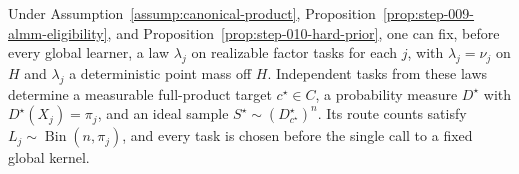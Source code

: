 \begin{lemma}
\label{lem:step-012-ideal-experiment}
Under Assumption~\ref{assump:canonical-product},
Proposition~\ref{prop:step-009-almm-eligibility}, and
Proposition~\ref{prop:step-010-hard-prior}, one can fix, before every global
learner, a law \(\lambda_j\) on realizable factor tasks for each \(j\),
with \(\lambda_j=\nu_j\) on \(H\) and \(\lambda_j\) a deterministic point
mass off \(H\).  Independent tasks from these laws determine a measurable
full-product target \(c^\star\in C\), a probability measure \(D^\star\)
with \(D^\star(X_j)=\pi_j\), and an ideal sample
\(S^\star\sim(D^\star_{c^\star})^n\).  Its route counts satisfy
\(L_j\sim\operatorname{Bin}(n,\pi_j)\), and every task is chosen before
the single call to a fixed global kernel.
\end{lemma}

